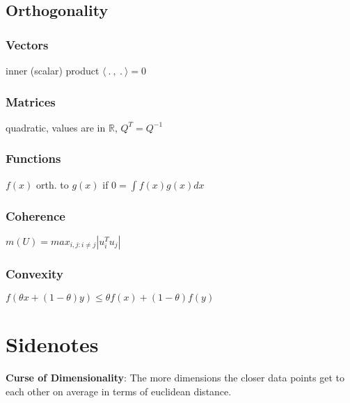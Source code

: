 \documentclass[a4paper,11pt,twocolumn]{article}
\begin{document}
\subsection{Orthogonality}

\subsubsection{Vectors} 

inner (scalar) product $\langle ~.~,~.~ \rangle = 0$

\subsubsection{Matrices} 

quadratic, values are in $\mathbb{R}$, $Q^T = Q^{-1}$

\subsubsection{Functions}

$f(x)$ orth. to $g(x)$ if $0 = \int f(x) g(x) dx $

\subsubsection{Coherence}

$m(U)= max_{i,j:i\neq j} | u_i^T u_j|$

\subsubsection{Convexity}

$f(\theta x + (1-\theta)y) \leq \theta f(x) + (1-\theta) f(y)$


\section{Sidenotes}

\textbf{Curse of Dimensionality}: The more dimensions the closer data points get to each other on average in terms of euclidean distance.
\end{document}
